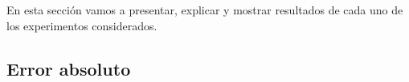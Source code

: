 En esta sección vamos a presentar, explicar y mostrar resultados de cada uno de los experimentos considerados.

\subsection{Error absoluto}


\newpage


